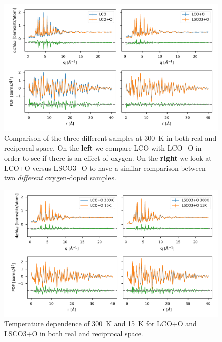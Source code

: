 \begin{figure}
    \centering
    \includegraphics[width=\textwidth]{fig/pdf/sample_comparison.pdf}
    \caption{Comparison of the three different samples at \SI{300}{\kelvin} in both real and reciprocal space. On the \textbf{left} we compare LCO with LCO+O in order to see if there is an effect of oxygen. On the \textbf{right} we look at LCO+O versus LSCO3+O to have a similar comparison between two \emph{different} oxygen-doped samples.}
    \label{fig:sample_comparision}    
\end{figure}

\begin{figure}
    \centering
    \includegraphics[width=\textwidth]{fig/pdf/temperature_comparison.pdf}
    \caption{Temperature dependence of \SI{300}{\kelvin} and \SI{15}{\kelvin} for LCO+O and LSCO3+O in both real and reciprocal space.}
    \label{fig:temperature_comparision}    
\end{figure}

